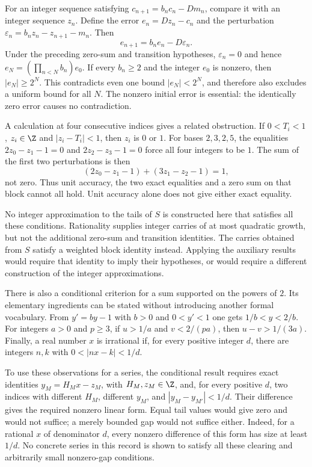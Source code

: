 For an integer sequence satisfying $c_{n+1}=b_nc_n-Dm_n$, compare it with
an integer sequence $z_n$.  Define the error $e_n=Dz_n-c_n$ and the
perturbation $\varepsilon_n=b_nz_n-z_{n+1}-m_n$.  Then
\[
 e_{n+1}=b_ne_n-D\varepsilon_n.
\]
Under the preceding zero-sum and transition hypotheses,
$\varepsilon_n=0$ and hence
$e_N=(\prod_{n<N}b_n)e_0$.  If every $b_n\ge2$ and the integer $e_0$ is
nonzero, then $|e_N|\ge2^N$.  This contradicts even one bound
$|e_N|<2^N$, and therefore also excludes a uniform bound for all $N$.
The nonzero initial error is essential: the identically zero error causes
no contradiction.

A calculation at four consecutive indices gives a related obstruction.  If
$0<T_i<1$, $z_i\in\Z$ and $|z_i-T_i|<1$, then $z_i$ is $0$ or $1$.
For bases $2,3,2,5$, the equalities
$2z_0-z_1-1=0$ and $2z_2-z_3-1=0$ force all four integers to be $1$.
The sum of the first two perturbations is then
\[
 (2z_0-z_1-1)+(3z_1-z_2-1)=1,
\]
not zero.  Thus unit accuracy, the two exact equalities and a zero sum on
that block cannot all hold.  Unit accuracy alone does not give either
exact equality.

No integer approximation to the tails of $S$ is constructed here that
satisfies all these conditions.
Rationality supplies integer carries of at most quadratic growth, but
not the additional zero-sum and transition identities.  The carries obtained from $S$ satisfy a weighted block identity
instead.  Applying the auxiliary results
would require that identity to imply their hypotheses, or would require
a different construction of the integer approximations.

There is also a conditional criterion for a sum supported on the powers
of $2$.  Its elementary ingredients can be stated without introducing
another formal vocabulary.  From $y'=by-1$ with $b>0$ and $0<y'<1$ one
gets $1/b<y<2/b$.  For integers $a>0$ and $p\ge3$, if $u>1/a$ and
$v<2/(pa)$, then
$u-v>1/(3a)$.  Finally, a real number $x$ is irrational if, for every
positive integer $d$, there are integers $n,k$ with
$0<|nx-k|<1/d$.

To use these observations for a series, the conditional result
requires exact identities $y_M=H_Mx-z_M$, with $H_M,z_M\in\Z$, and,
for every positive $d$, two indices with different $H_M$, different
$y_M$, and $|y_M-y_{M'}|<1/d$.  Their difference gives the required
nonzero linear form.  Equal tail values would give zero and would not suffice;
a merely bounded gap would not suffice either.  Indeed, for a rational
$x$ of denominator $d$, every nonzero difference of this form has size at
least $1/d$.  No concrete series in this record is shown to satisfy all
these clearing and arbitrarily small nonzero-gap conditions.

